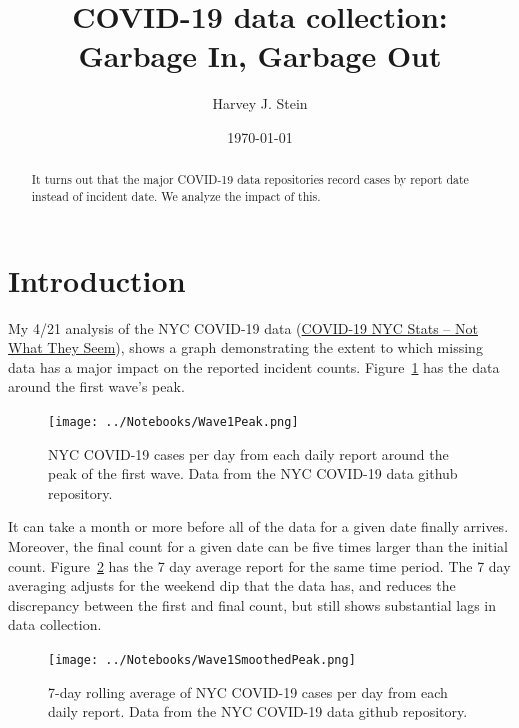 \documentclass[10pt,reqno]{amsart}
\author{Harvey J. Stein}
\date{\today}
\begin{document}
\title{COVID-19 data collection: Garbage In, Garbage Out}

\begin{abstract}
  It turns out that the major COVID-19 data repositories record cases
  by report date instead of incident date.  We analyze the impact of
  this.
\end{abstract}

\maketitle
\tableofcontents

\section{Introduction}
\label{sec:intro}
My 4/21 analysis of the NYC COVID-19 data
(\href{https://hjstein.blogspot.com/2020/04/covid-19-nyc-stats-not-what-they-seem.html}{COVID-19 NYC Stats -- Not What They Seem}),
shows a graph demonstrating the extent to which missing
data has a major impact on the reported incident
counts.\nocite{nyc2020data,Stein2020nycdata,Stein2020owiddata,owid2020data}
Figure~\ref{fig:daily} has the data around the first wave's peak.\nocite{Stein2020Seem}\nocite{Stein2020Ray}

\begin{figure}[!htb]
  \centering
  \texttt{[image: ../Notebooks/Wave1Peak.png]}
  \caption[NYC COVID-19 cases per day, each daily report, first
  peak]{NYC COVID-19 cases per day from each daily report around the
    peak of the first wave.  Data from the NYC COVID-19 data github
    repository.}
  \label{fig:daily}
\end{figure}

It can take a month or more before all of the data for
a given date finally arrives.  Moreover, the final count for a given date
can be five times larger than the initial count.
Figure~\ref{fig:smoothDaily} has the 7 day average report for the same
time period.  The 7 day averaging adjusts for the weekend dip that the
data has, and reduces the discrepancy between the first and final
count, but still shows substantial lags in data collection.

\begin{figure}[!htb]
  \centering
  \texttt{[image: ../Notebooks/Wave1SmoothedPeak.png]}
  \caption{7-day rolling average of NYC COVID-19 cases per day from each daily report.  Data
    from the NYC COVID-19 data github repository.}
  \label{fig:smoothDaily}
\end{figure}
\end{document}
